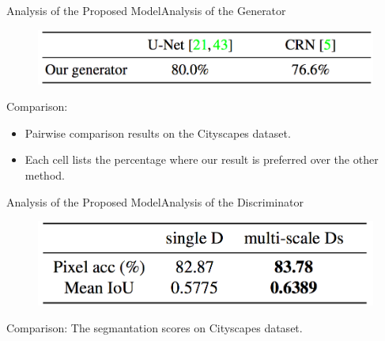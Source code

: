 \documentclass{beamer}
\begin{document}
\begin{frame}{Analysis of the Proposed Model}{Analysis of  the Generator}
\begin{figure}
	\centering
	\includegraphics[height=0.2\textheight]{images/table_3}
\end{figure}
%
%
\begin{beamerboxesrounded}[upper=uppercol,lower=lowercol,shadow=false]{Comparison: }
	\begin{itemize}
		\item
Pairwise comparison results on the Cityscapes dataset.
\item
 Each cell lists the percentage where our result is preferred over the other method.
 \end{itemize}
\end{beamerboxesrounded}
\end{frame}

\begin{frame}{Analysis of the  Proposed Model}{Analysis of the Discriminator}
\begin{figure}
	\centering
	\includegraphics[height=0.3\textheight]{images/table_4}
\end{figure}
%
%
\begin{beamerboxesrounded}[upper=uppercol,lower=lowercol,shadow=false]{Comparison: }
The segmantation scores on Cityscapes dataset.
\end{beamerboxesrounded}
\end{frame}
\end{document}
